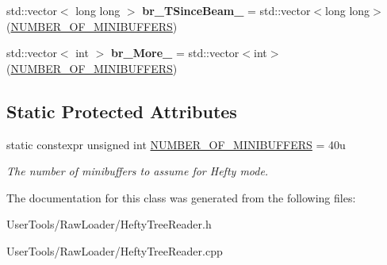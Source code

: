 \begin{DoxyCompactItemize}
\item 
\hypertarget{classannie_1_1HeftyTreeReader_a8e22c0da1a46e96fa224b620c5479d08}{
std::vector$<$ long long $>$ {\bfseries br\_\-TSinceBeam\_\-} = std::vector$<$long long$>$(\hyperlink{classannie_1_1HeftyTreeReader_a3ed132051c32e82aa67c7df43eacd77c}{NUMBER\_\-OF\_\-MINIBUFFERS})}
\label{classannie_1_1HeftyTreeReader_a8e22c0da1a46e96fa224b620c5479d08}

\item 
\hypertarget{classannie_1_1HeftyTreeReader_a5f8ade8dd21cfe7393744a4ab5e20a72}{
std::vector$<$ int $>$ {\bfseries br\_\-More\_\-} = std::vector$<$int$>$(\hyperlink{classannie_1_1HeftyTreeReader_a3ed132051c32e82aa67c7df43eacd77c}{NUMBER\_\-OF\_\-MINIBUFFERS})}
\label{classannie_1_1HeftyTreeReader_a5f8ade8dd21cfe7393744a4ab5e20a72}

\end{DoxyCompactItemize}
\subsection*{Static Protected Attributes}
\begin{DoxyCompactItemize}
\item 
\hypertarget{classannie_1_1HeftyTreeReader_a3ed132051c32e82aa67c7df43eacd77c}{
static constexpr unsigned int \hyperlink{classannie_1_1HeftyTreeReader_a3ed132051c32e82aa67c7df43eacd77c}{NUMBER\_\-OF\_\-MINIBUFFERS} = 40u}
\label{classannie_1_1HeftyTreeReader_a3ed132051c32e82aa67c7df43eacd77c}

\begin{DoxyCompactList}\small\item\em The number of minibuffers to assume for Hefty mode. \item\end{DoxyCompactList}\end{DoxyCompactItemize}


The documentation for this class was generated from the following files:\begin{DoxyCompactItemize}
\item 
UserTools/RawLoader/HeftyTreeReader.h\item 
UserTools/RawLoader/HeftyTreeReader.cpp\end{DoxyCompactItemize}
